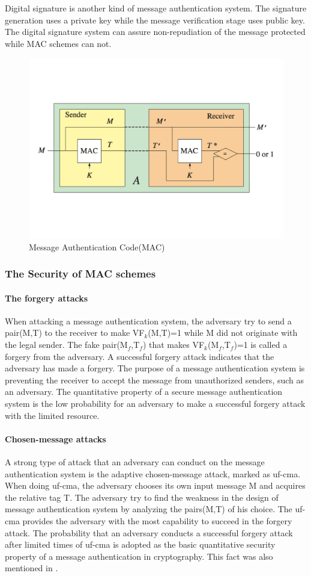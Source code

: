\documentclass{article}
\begin{document}
Digital signature is another kind of message authentication system. The signature generation uses a private key while the message verification stage uses public key. The digital signature system can assure non-repudiation of the message protected while MAC schemes can not.
\begin{figure}[htbp]
\centering
\includegraphics[scale=0.4]{./diagrams/MAC.pdf}
\caption{Message Authentication Code(MAC)}
\label{fig:2 }
\end{figure}
\subsubsection{The Security of MAC schemes}
\paragraph{The forgery attacks}
When attacking a message authentication system, the adversary try to send a pair(M,T) to the receiver to make VF$_k$(M,T)=1 while M did not originate with the legal sender. The fake pair(M$_f$,T$_f$) that makes VF$_k$(M$_f$,T$_f$)=1 is called a forgery from the adversary. A successful forgery attack indicates that the adversary has made a forgery. 
The purpose of a message authentication system is preventing the receiver to accept the message from unauthorized senders, such as an adversary. The quantitative property of a secure message authentication system is the low probability for an adversary to make a successful forgery attack with the limited resource.
\paragraph{Chosen-message attacks}
A strong type of attack that an adversary can conduct on the message authentication system is the adaptive chosen-message attack, marked as uf-cma. When doing uf-cma, the adversary chooses its own input message M and acquires the relative tag T. The adversary try to find the weakness in the design of message authentication system by analyzing the pairs(M,T) of his choice. The uf-cma provides the adversary with the most capability to succeed in the forgery attack. The probability that an adversary conducts a successful forgery attack after limited times of uf-cma is adopted as the basic quantitative security property of a message authentication in cryptography. This fact was also mentioned in \cite{Rogaway2011}.
\end{document}
